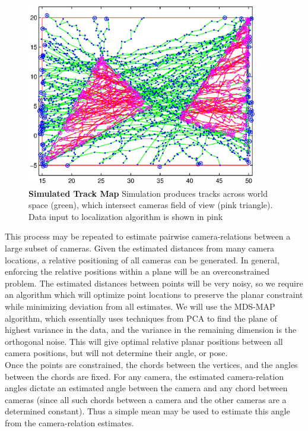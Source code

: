 \documentclass[journal]{IEEEtran}
\begin{document}
	\begin{figure}
		\centering
		\includegraphics[width=4in]{./paths.eps}
		\caption{\textbf{Simulated Track Map}  Simulation produces tracks across world 
										space (green), which intersect cameras 
										field of view (pink triangle). Data input to
										localization algorithm is shown in pink}
		\label{paths}
	\end{figure}
		\indent This process may be repeated to estimate pairwise camera-relations between a large subset of cameras. Given the estimated distances from many camera locations, a relative positioning of all cameras can be generated. In general, enforcing the relative positions within a plane will be an overconstrained problem. The estimated distances between points will be very noisy, so we require an algorithm which will optimize point locations to preserve the planar constraint while minimizing deviation from all estimates. We will use the MDS-MAP algorithm, which essentially uses techniques from PCA to find the plane of highest variance in the data, and the variance in the remaining dimension is the orthogonal noise. This will give optimal relative planar positions between all camera positions, but will not determine their angle, or pose. \\
		\indent Once the points are constrained, the chords between the vertices, and the angles between the chords are fixed. For any camera, the estimated camera-relation angles dictate an estimated angle between the camera and any chord between cameras (since all such chords between a camera and the other cameras are a determined constant). Thus a simple mean may be used to estimate this angle from the camera-relation estimates.
\end{document}
